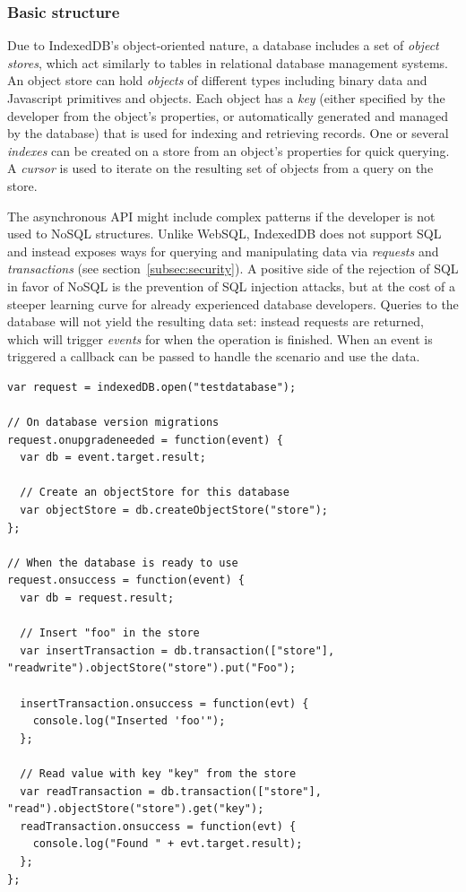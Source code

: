 \subsubsection{Basic structure}
Due to IndexedDB's object-oriented nature, a database includes a set of \emph{object stores}, which act similarly to tables in relational database management systems. An object store can hold \emph{objects} of different types including binary data and Javascript primitives and objects. Each object has a \emph{key} (either specified by the developer from the object's properties, or automatically generated and managed by the database) that is used for indexing and retrieving records. One or several \emph{indexes} can be created on a store from an object's properties for quick querying. A \emph{cursor} is used to iterate on the resulting set of objects from a query on the store.

The asynchronous API might include complex patterns if the developer is not used to NoSQL structures. Unlike WebSQL, IndexedDB does not support SQL and instead exposes ways for querying and manipulating data via \emph{requests} and \emph{transactions} (see section~\ref{subsec:security}). A positive side of the rejection of SQL in favor of NoSQL is the prevention of SQL injection attacks, but at the cost of a steeper learning curve for already experienced database developers. Queries to the database will not yield the resulting data set: instead requests are returned, which will trigger \emph{events} for when the operation is finished. When an event is triggered a callback can be passed to handle the scenario and use the data.

\begin{Code}
\begin{lstlisting}[caption={Use of IndexedDB}]
var request = indexedDB.open("testdatabase");

// On database version migrations
request.onupgradeneeded = function(event) {
  var db = event.target.result;

  // Create an objectStore for this database
  var objectStore = db.createObjectStore("store");
};

// When the database is ready to use
request.onsuccess = function(event) {
  var db = request.result;

  // Insert "foo" in the store
  var insertTransaction = db.transaction(["store"], "readwrite").objectStore("store").put("Foo");

  insertTransaction.onsuccess = function(evt) {
    console.log("Inserted 'foo'");
  };

  // Read value with key "key" from the store
  var readTransaction = db.transaction(["store"], "read").objectStore("store").get("key");
  readTransaction.onsuccess = function(evt) {
    console.log("Found " + evt.target.result);
  };
};
\end{lstlisting}
\end{Code}

